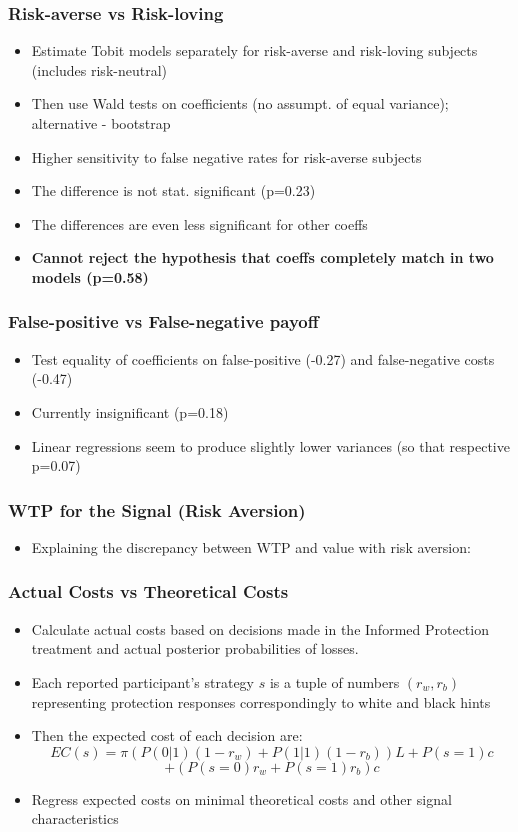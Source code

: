 \documentclass[11pt,hyperref={bookmarks=false}]{beamer}
\begin{document}
\begin{frame}
\frametitle{Risk-averse vs Risk-loving}
\begin{itemize}
\item Estimate Tobit models separately for risk-averse and risk-loving subjects (includes risk-neutral) 
\item Then use Wald tests on coefficients (no assumpt. of equal variance); alternative - bootstrap
\item Higher sensitivity to false negative rates for risk-averse subjects
\item The difference is not stat. significant (p=0.23)
\item The differences are even less significant for other coeffs
\item \textbf{Cannot reject the hypothesis that coeffs completely match in two models (p=0.58)}
\end{itemize}
\end{frame}


\begin{frame}
\frametitle{False-positive vs False-negative payoff}
\begin{itemize}
\item Test equality of coefficients on false-positive (-0.27) and false-negative costs (-0.47)
\item Currently insignificant (p=0.18)
\item Linear regressions seem to produce slightly lower variances (so that respective p=0.07)
\end{itemize}
\end{frame}




\begin{frame}
\frametitle{WTP for the Signal (Risk Aversion)}
\begin{itemize}
\item Explaining the discrepancy between WTP and value with risk aversion:
\end{itemize}
\footnotesize

\end{frame}


\begin{frame}
\frametitle{Actual Costs vs Theoretical Costs}
\begin{itemize}
\item Calculate actual costs based on decisions made in the Informed Protection treatment and actual posterior probabilities of losses.
\item Each reported participant's strategy $s$ is a tuple of numbers $(r_w,r_b)$ representing protection responses correspondingly to white and black hints
\item Then the expected cost of each decision are:
\small
$$EC(s)=\pi (P(0|1)(1-r_w)+P(1|1)(1-r_b))L+P(s=1)c$$
$$+(P(s=0)r_w+P(s=1)r_b)c$$
\normalsize
\item Regress expected costs on minimal theoretical costs and other signal characteristics
\end{itemize}
\end{frame}
\end{document}

